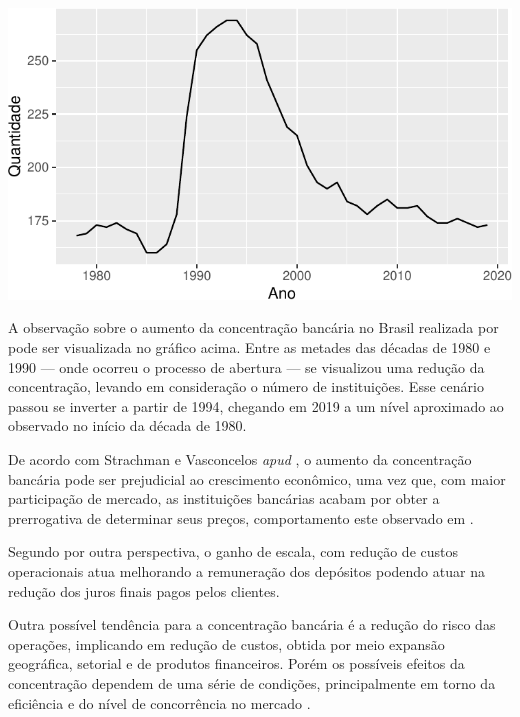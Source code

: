 \documentclass[12pt,openright,oneside,a4paper,chapter=TITLE,section=TITLE,subsection=Title,english,french,spanish,portugues,sumario=tradicional]{04-class-files/abntex2}
\begin{document}

\begin{center}\includegraphics{jacksontorres_files/figure-latex/concetration-1} \end{center}

\label{fig:concentracao}

A observação sobre o aumento da concentração bancária no Brasil realizada por \textcite{camargo:2009} pode ser visualizada no gráfico acima. Entre as metades das décadas de 1980 e 1990 --- onde ocorreu o processo de abertura --- se visualizou uma redução da concentração, levando em consideração o número de instituições. Esse cenário passou se inverter a partir de 1994, chegando em 2019 a um nível aproximado ao observado no início da década de 1980.

De acordo com Strachman e Vasconcelos \emph{apud} \textcite{camargo:2009}, o aumento da concentração bancária pode ser prejudicial ao crescimento econômico, uma vez que, com maior participação de mercado, as instituições bancárias acabam por obter a prerrogativa de determinar seus preços, comportamento este observado em \textcite{klein:1971}.

Segundo \textcite{camargo:2009} por outra perspectiva, o ganho de escala, com redução de custos operacionais atua melhorando a remuneração dos depósitos podendo atuar na redução dos juros finais pagos pelos clientes.

Outra possível tendência para a concentração bancária é a redução do risco das operações, implicando em redução de custos, obtida por meio expansão geográfica, setorial e de produtos financeiros. Porém os possíveis efeitos da concentração dependem de uma série de condições, principalmente em torno da eficiência e do nível de concorrência no mercado \cite{camargo:2009}.
\end{document}
